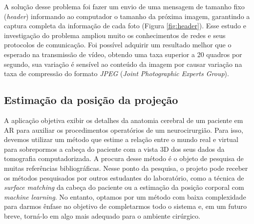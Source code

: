 

A solução desse problema foi fazer um envio de uma mensagem de tamanho fixo (\textit{header}) informando ao computador o tamanho da próxima imagem, garantindo a captura completa da informação de cada foto (Figura \ref{fig:header}). Esse estudo e investigação do problema ampliou muito os conhecimentos de redes e seus protocolos de comunicação. Foi possível adquirir um resultado melhor que o esperado na transmissão de vídeo, obtendo uma taxa superior a 20 quadros por segundo, sua variação é sensível ao conteúdo da imagem por causar variação na taxa de compressão do formato \textit{JPEG} (\textit{Joint Photographic Experts Group}). 

\subsection{Estimação da posição da projeção}

A aplicação objetiva exibir os detalhes da anatomia cerebral de um paciente em AR para auxiliar os procedimentos operatórios de um neurocirurgião. Para isso, devemos utilizar um método que estime a relação entre o mundo real e virtual para sobrepormos a cabeça do paciente com a vista 3D dos seus dados da tomografia computadorizada. A procura desse método é o objeto de pesquisa de muitas referências bibliográficas. Nesse ponto da pesquisa, o projeto pode receber os métodos pesquisados por outros estudantes do laboratório, como a técnica de \textit{surface matching} da cabeça do paciente ou a estimação da posição corporal com \textit{machine learning}. No entanto, optamos por um método com baixa complexidade para darmos ênfase no objetivo de completarmos todo o sistema e, em um futuro breve, torná-lo em algo mais adequado para o ambiente cirúrgico.

